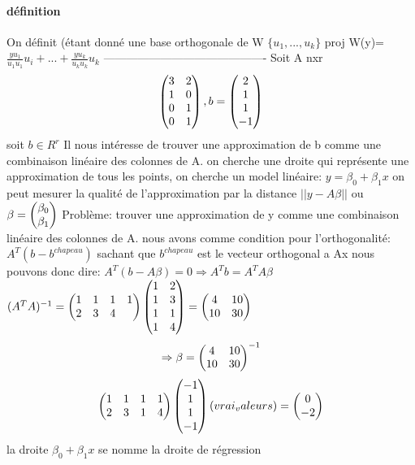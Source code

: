 \documentclass[a4paper,10pt]{article}
\begin{document}
\paragraph{définition}
On définit (étant donné une base orthogonale de W $\{u_1,...,u_k\}$
\newline
proj W(y)=$\frac{yu_1}{u_1u_1}u_i+...+\frac{yu_k}{u_ku_k}u_k$
\newline
-------------------------------------------
\newline
Soit A nxr
\newline
\[
\begin{pmatrix}
 3&2\cr
 1&0\cr
 0&1\cr
 0&1\cr
\end{pmatrix}
,b=\begin{pmatrix}
    2\cr
    1\cr
    1\cr
    -1\cr
   \end{pmatrix}
\]
\newline
soit $b\in R^r$
\newline
Il nous intéresse de trouver une approximation de b comme une combinaison linéaire des colonnes de A.
\newline
on cherche une droite qui représente une approximation de tous les points, on cherche un model linéaire: $y=\beta_0+\beta_1x$
\newline
on peut mesurer la qualité de l'approximation par la distance
\newline
$||y-A\beta||$ ou $\beta=\begin{pmatrix}
                          \beta_0\cr
                          \beta_1\cr
                         \end{pmatrix}$
\newline
Problème: trouver une approximation de y comme une combinaison linéaire des colonnes de A.
\newline
nous avons comme condition pour l'orthogonalité: $A^T(b-b^{chapeau})$ sachant que $b^{chapeau}$ est le vecteur orthogonal a Ax
\newline
nous pouvons donc dire: $A^T(b-A\beta)=0\Rightarrow A^Tb=A^TA\beta$
\newline
$(A^TA)^{-1}=
\begin{pmatrix}
 1&1&1&1\cr
 2&3&4\cr
\end{pmatrix}
\begin{pmatrix}
 1&2\cr
 1&3\cr
 1&1\cr
 1&4\cr
\end{pmatrix}
=\begin{pmatrix}
  4&10\cr
  10&30\cr
 \end{pmatrix}
$
\newline
\[
\Rightarrow \beta=\begin{pmatrix}
                   4&10\cr
                   10&30\cr
                  \end{pmatrix}^{-1}
\]
\newline
\[
\begin{pmatrix}
 1&1&1&1\cr
 2&3&1&4\cr
\end{pmatrix}
\begin{pmatrix}
 -1\cr
 1\cr
 1\cr
 -1\cr
\end{pmatrix}(vrai_valeurs)
=\begin{pmatrix}
  0\cr
  -2\cr
 \end{pmatrix}
\]
\newline
la droite $\beta_0+\beta_1x$ se nomme la droite de régression
\end{document}
